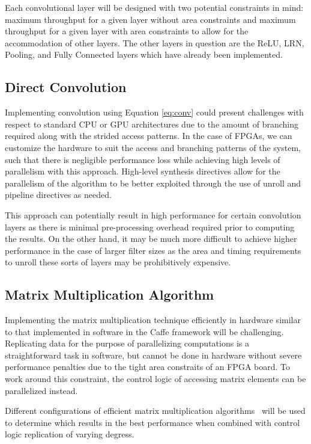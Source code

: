 \documentclass[conference,compsoc]{IEEEtran/IEEEtran}
\begin{document}
Each convolutional layer will be designed with two potential constraints in mind:
maximum throughput for a given layer without area constraints and maximum throughput
for a given layer with area constraints to allow for the accommodation of other
layers. The other layers in question are the ReLU, LRN, Pooling, and Fully Connected
layers which have already been implemented.

\subsection{Direct Convolution}
Implementing convolution using Equation \ref{eq:conv} could present challenges with respect to standard CPU or GPU architectures
due to the amount of branching required along with the strided access patterns. In the case of FPGAs, we can customize the hardware
to suit the access and branching patterns of the system, such that there is negligible performance loss while achieving high
levels of parallelism with this approach. High-level synthesis directives allow for the parallelism of the algorithm to be better
exploited through the use of unroll and pipeline directives as needed.

This approach can potentially result in high performance for certain convolution layers as there is minimal pre-processing overhead
required prior to computing the results. On the other hand, it may be much more difficult to achieve higher performance in the case of
larger filter sizes as the area and timing requirements to unroll these sorts of layers may be prohibitively expensive.



\subsection{Matrix Multiplication Algorithm}
Implementing the matrix multiplication technique efficiently in hardware similar to that implemented in software in the Caffe framework will be challenging.
Replicating data for the purpose of parallelizing computations is a straightforward task in software, but cannot be done in hardware without severe performance penalties due to the tight area constraits of an FPGA board.
To work around this constraint, the control logic of accessing matrix elements can be parallelized instead.

Different configurations of efficient matrix multiplication algorithms~\cite{MM_strassen,MM_efficient} will be used to determine which results in the best performance when combined with control logic replication of varying degress.
\end{document}
